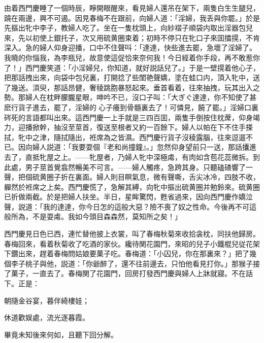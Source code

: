 由着西門慶睡了一個時辰，睜開眼醒來，看見婦人還吊在架下，兩隻白生生腿兒，蹺在兩邊，興不可遏。因見春梅不在跟前，向婦人道：「淫婦，我丢與你罷。」於是先摳出牝中李子，教婦人吃了。坐在一隻枕頭上，向紗褶子順袋内取出淫器包兒來，先以初使上銀托子，次又用硫黄圈束着；初時不停只在牝口子來囬擂㨪，不肯深入。急的婦人仰身迎播，口中不住聲呌：「達達，快些進去罷，急壞了淫婦了。我曉的你惱我，為李瓶兒，故意使這促恰來奈何我！今日經着你手段，再不敢惹你了！」西門慶笑道：「小淫婦兒，你知道，就好説話兒了。」于是一壁㨪着他心子，把那話拽出來，向袋中包兒裏，打開捻了些閨艳聲嬌，塗在蛙口内，頂入牝中，送了幾送。湏臾，那話昂健，奢稜跳胞暴怒起來。垂首看着，往來抽拽，玩其出入之勢。那婦人在枕畔朦朧星眼，呻吟不已，沒口子叫：「大ぎぐ達達，你不知使了甚麽行貨子進去，罷了，淫婦的𣭈心子癢到骨髓裏去了！可憐見，饒了罷。」淫婦口裏硶死的言語都叫出來。這西門慶一上手就是三四百囬，兩隻手倒按住枕蓆，仰身竭力，迎播掀幹，抽沒至莖首，復送至根者又約一百餘下。婦人以帕在下不住手搽拭，牝中之津，隨拭隨出，袵席為之皆濕。西門慶行貨子沒稜露腦，往來逗遛不已。因向婦人説道：「我要耍個『老和尚撞鐘』。」忽然仰身望前只一送，那話攮進去了，直抵牝屋之上。——牝屋者，乃婦人牝中深極䖏，有肉如含苞花蕊微拆。到此處，男子莖首覺翕然暢美不可言。——婦人觸疼，急跨其身。只聽磕碴響了一聲，把個硫黄圈子折在裏面。婦人則目瞑氣息，微有聲嘶，舌尖冰冷，四肢不收，軃然於袵席之上矣。西門慶慌了，急解其縛，向牝中摳出硫黄圈并勉鈴來。硫黄圈已折做兩截。於是把婦人扶坐。半日，星眸驚閃，甦省過來，因向西門慶作嬌泣聲，説道：「我的達達，你今日怎的這般大惡？險不喪了奴之性命。今後再不可這般所為，不是耍䖏。我如今頭目森森然，莫知所之矣！」

西門慶見日色已西，連忙替他披上衣裳，叫了春梅秋菊來收拾衾枕，同扶他歸房。春梅回來，看着秋菊收了吃酒的家伙。纔待関花園門，來昭的兒子小鐵棍兒従花架下鑽出來，趕着春梅問姑娘要菓子吃。春梅道：「小囚兒，你在那裏來？」把了幾個李子桃子與他，説道：「你爺醉了，還不往前邊去，只怕他看見打你。」那猴子接了菓子，一直去了。春梅関了花園門，回房打發西門慶與婦人上牀就寢。不在話下。正是：

\begin{myquote}
朝隨金谷宴，暮伴綺樓娃；

休道歡娱處，流光逐暮霞。
\end{myquote}

畢竟未知後來何如，且聽下回分解。

